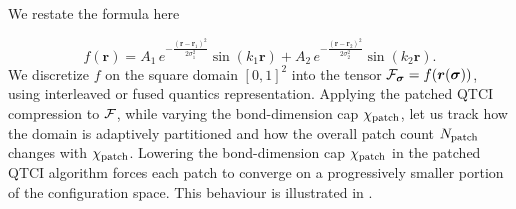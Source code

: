 We restate the formula here

\begin{equation*}
		f(\boldsymbol{r}) = A_1\,e^{-\frac{(\boldsymbol{r} - \boldsymbol{r}_1)^2}{2\sigma^2_1}} \sin(k_1\boldsymbol{r}) + A_2\,e^{-\frac{(\boldsymbol{r} - \boldsymbol{r}_2)^2}{2\sigma^2_2}} \sin(k_2\boldsymbol{r}). 
\end{equation*}
We discretize $f$ on the square domain $[0,1]^2$ into the tensor $\mathcal{F}_{\boldsymbol{\sigma}} = f(\boldsymbol{r}(\boldsymbol{\sigma}))$, using interleaved or fused quantics representation. Applying the patched QTCI compression to $\mathcal{F}$, while varying the bond-dimension cap $\chi_{\text{patch}}$, let us track how the domain is adaptively partitioned and how the overall patch count $N_{\text{patch}}$ changes with $\chi_{\text{patch}}$. 
Lowering the bond-dimension cap $\chi_{\text{patch}}$ in the patched QTCI algorithm forces each patch to converge on a progressively smaller portion of the configuration space. This behaviour is illustrated in . 

